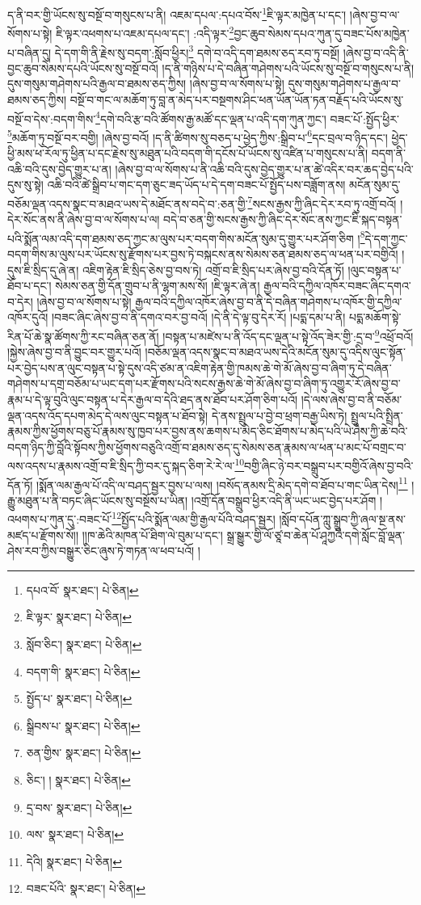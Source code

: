ད་ནི་བར་གྱི་ཡོངས་སུ་བསྔོ་བ་གསུངས་པ་ནི། འཇམ་དཔལ་:དཔའ་བོས་\footnote{དཔའ་བོ་  སྣར་ཐང་།  པེ་ཅིན། }ཇི་ལྟར་མཁྱེན་པ་དང་། །ཞེས་བྱ་བ་ལ་སོགས་པ་སྟེ། ཇི་ལྟར་འཕགས་པ་འཇམ་དཔལ་དང་། :འདི་ལྟར་\footnote{ཇི་ལྟར་  སྣར་ཐང་།  པེ་ཅིན། }བྱང་ཆུབ་སེམས་དཔའ་ཀུན་དུ་བཟང་པོས་མཁྱེན་པ་བཞིན་དུ། དེ་དག་གི་ནི་རྗེས་སུ་བདག་:སློབ་ཕྱིར།\footnote{སློབ་ཅིང་།  སྣར་ཐང་།  པེ་ཅིན། } དགེ་བ་འདི་དག་ཐམས་ཅད་རབ་ཏུ་བསྔོ། །ཞེས་བྱ་བ་འདི་ནི་བྱང་ཆུབ་སེམས་དཔའི་ཡོངས་སུ་བསྔོ་བའོ། །ད་ནི་གཉིས་པ་དེ་བཞིན་གཤེགས་པའི་ཡོངས་སུ་བསྔོ་བ་གསུངས་པ་ནི། དུས་གསུམ་གཤེགས་པའི་རྒྱལ་བ་ཐམས་ཅད་ཀྱིས། །ཞེས་བྱ་བ་ལ་སོགས་པ་སྟེ། དུས་གསུམ་གཤེགས་པ་རྒྱལ་བ་ཐམས་ཅད་ཀྱིས། བསྔོ་བ་གང་ལ་མཆོག་ཏུ་བླ་ན་མེད་པར་བསྔགས་ཤིང་ཕན་ཡོན་ཡོན་ཏན་བརྗོད་པའི་ཡོངས་སུ་བསྔོ་བ་དེས་:བདག་གིས་\footnote{བདག་གི་  སྣར་ཐང་།  པེ་ཅིན། }དགེ་བའི་རྩ་བའི་ཚོགས་རྒྱ་མཚོ་དང་ལྡན་པ་འདི་དག་ཀུན་ཀྱང་། བཟང་པོ་:སྤྱོད་ཕྱིར་\footnote{སྤྱོད་པ་  སྣར་ཐང་།  པེ་ཅིན། }མཆོག་ཏུ་བསྔོ་བར་བགྱི། །ཞེས་བྱ་བའོ། །ད་ནི་ཚིགས་སུ་བཅད་པ་ཕྱེད་ཀྱིས་:སྒྲིབ་པ་\footnote{སྒྲིབས་པ་  སྣར་ཐང་།  པེ་ཅིན། }དང་བྲལ་བ་ཉིད་དང་། ཕྱེད་ཕྱི་མས་ཕ་རོལ་ཏུ་ཕྱིན་པ་དང་རྗེས་སུ་མཐུན་པའི་བདག་གི་དངོས་པོ་ཡོངས་སུ་འཛིན་པ་གསུངས་པ་ནི། བདག་ནི་འཆི་བའི་དུས་བྱེད་གྱུར་པ་ན། །ཞེས་བྱ་བ་ལ་སོགས་པ་ནི་འཆི་བའི་དུས་བྱེད་གྱུར་པ་ན་ཚེ་འདིར་བར་ཆད་བྱེད་པའི་དུས་སུ་སྟེ། འཆི་བའི་ཚེ་སྒྲིབ་པ་གང་དག་ཅུང་ཟད་ཡོད་པ་དེ་དག་བཟང་པོ་སྤྱོད་པས་བཟློག་ནས། མངོན་སུམ་དུ་བཅོམ་ལྡན་འདས་སྣང་བ་མཐའ་ཡས་དེ་མཐོང་ནས་བདེ་བ་:ཅན་གྱི་\footnote{ཅན་གྱིས་  སྣར་ཐང་།  པེ་ཅིན། }སངས་རྒྱས་ཀྱི་ཞིང་དེར་རབ་ཏུ་འགྲོ་བའོ། །དེར་སོང་ནས་ནི་ཞེས་བྱ་བ་ལ་སོགས་པ་ལ། བདེ་བ་ཅན་གྱི་སངས་རྒྱས་ཀྱི་ཞིང་དེར་སོང་ནས་ཀྱང་ཇི་སྐད་བསྟན་པའི་སྨོན་ལམ་འདི་དག་ཐམས་ཅད་ཀྱང་མ་ལུས་པར་བདག་གིས་མངོན་སུམ་དུ་གྱུར་པར་ཤོག་ཅིག །\footnote{ཅིང་། །  སྣར་ཐང་།  པེ་ཅིན། }དེ་དག་ཀྱང་བདག་གིས་མ་ལུས་པར་ཡོངས་སུ་རྫོགས་པར་བྱས་ཏེ་བསྐངས་ནས་སེམས་ཅན་ཐམས་ཅད་ལ་ཕན་པར་བགྱིའོ། །དུས་ཇི་སྲིད་དུ་ཞེ་ན། འཇིག་རྟེན་ཇི་སྲིད་ཅེས་བྱ་བས་ཏེ། འགྲོ་བ་ཇི་སྲིད་པར་ཞེས་བྱ་བའི་དོན་ཏོ། །ལུང་བསྟན་པ་ཐོབ་པ་དང་། སེམས་ཅན་གྱི་དོན་གྲུབ་པ་ནི་ལྷག་མས་སོ། །ཇི་ལྟར་ཞེ་ན། རྒྱལ་བའི་དཀྱིལ་འཁོར་བཟང་ཞིང་དགའ་བ་དེར། །ཞེས་བྱ་བ་ལ་སོགས་པ་སྟེ། རྒྱལ་བའི་དཀྱིལ་འཁོར་ཞེས་བྱ་བ་ནི་དེ་བཞིན་གཤེགས་པ་འཁོར་གྱི་དཀྱིལ་འཁོར་དུའོ། །བཟང་ཞིང་ཞེས་བྱ་བ་ནི་དགའ་བར་བྱ་བའོ། །དེ་ནི་དེ་ལྟ་བུ་དེར་རོ། །པདྨ་དམ་པ་ནི། པདྨ་མཆོག་སྟེ་རིན་པོ་ཆེ་སྣ་ཚོགས་ཀྱི་རང་བཞིན་ཅན་ནོ། །བསྟན་པ་མཛེས་པ་ནི་འོད་དང་ལྡན་པ་སྟེ་འོད་ཟེར་གྱི་:དྲ་བ་\footnote{དྲ་བས་  སྣར་ཐང་།  པེ་ཅིན། }འཕྲོ་བའོ། །སྐྱེས་ཞེས་བྱ་བ་ནི་བྱུང་བར་གྱུར་པའོ། །བཅོམ་ལྡན་འདས་སྣང་བ་མཐའ་ཡས་དེའི་མངོན་སུམ་དུ་འདིས་ལུང་སྟོན་པར་བྱེད་པས་ན་ལུང་བསྟན་པ་སྟེ་དུས་འདི་ཙམ་ན་འཇིག་རྟེན་གྱི་ཁམས་ཆེ་གེ་མོ་ཞེས་བྱ་བ་ཞིག་ཏུ་དེ་བཞིན་གཤེགས་པ་དགྲ་བཅོམ་པ་ཡང་དག་པར་རྫོགས་པའི་སངས་རྒྱས་ཆེ་གེ་མོ་ཞེས་བྱ་བ་ཞིག་ཏུ་འགྱུར་རོ་ཞེས་བྱ་བ་རྣམ་པ་དེ་ལྟ་བུའི་ལུང་བསྟན་པ་དེར་རྒྱལ་བ་དེའི་ཐད་ནས་ཐོབ་པར་ཤོག་ཅིག་པའོ། །དེ་ལས་ཞེས་བྱ་བ་ནི་བཅོམ་ལྡན་འདས་འོད་དཔག་མེད་དེ་ལས་ལུང་བསྟན་པ་ཐོབ་སྟེ། དེ་ནས་སྤྲུལ་པ་བྱེ་བ་ཕྲག་བརྒྱ་ཡིས་ཏེ། སྤྲུལ་པའི་སྤྲིན་རྣམས་ཀྱིས་ཕྱོགས་བཅུ་པོ་རྣམས་སུ་ཁྱབ་པར་བྱས་ནས་ཆགས་པ་མེད་ཅིང་ཐོགས་པ་མེད་པའི་ཡེ་ཤེས་ཀྱི་ཆེ་བའི་བདག་ཉིད་ཀྱི་བློའི་སྟོབས་ཀྱིས་ཕྱོགས་བཅུའི་འགྲོ་བ་ཐམས་ཅད་དུ་སེམས་ཅན་རྣམས་ལ་ཕན་པ་མང་པོ་བགྲང་བ་ལས་འདས་པ་རྣམས་འགྲོ་བ་ཇི་སྲིད་ཀྱི་བར་དུ་སྐད་ཅིག་རེ་རེ་ལ་\footnote{ལས་  སྣར་ཐང་།  པེ་ཅིན། }བགྱི་ཞིང་ཉེ་བར་བསྒྲུབ་པར་བགྱིའོ་ཞེས་བྱ་བའི་དོན་ཏོ། །སྨོན་ལམ་རྒྱལ་པོ་འདི་ལ་བཤད་སྦྱར་བྱས་པ་ལས། །བསོད་ནམས་དྲི་མེད་དགེ་བ་ཐོབ་པ་གང་ཡིན་དེས།\footnote{དེའི།  སྣར་ཐང་།  པེ་ཅིན། } །རྒྱུ་མཐུན་པ་ནི་བཏང་ཞིང་ཡོངས་སུ་བསྔོས་པ་ཡིན། །འགྲོ་དོན་བསྒྲུབ་ཕྱིར་འདི་ནི་ཡང་ཡང་བྱེད་པར་ཤོག །འཕགས་པ་ཀུན་དུ་:བཟང་པོ་\footnote{བཟང་པོའི་  སྣར་ཐང་།  པེ་ཅིན། }སྤྱོད་པའི་སྨོན་ལམ་གྱི་རྒྱལ་པོའི་བཤད་སྦྱར། །སློབ་དཔོན་ཀླུ་སྒྲུབ་ཀྱི་ཞལ་སྔ་ནས་མཛད་པ་རྫོགས་སོ།། །།ཁ་ཆེའི་མཁན་པོ་ཐིག་ལེ་བུམ་པ་དང་། སྒྲ་སྒྱུར་གྱི་ལོ་ཙཱ་བ་ཆེན་པོ་ཤཱཀྱའི་དགེ་སློང་བློ་ལྡན་ཤེས་རབ་ཀྱིས་བསྒྱུར་ཅིང་ཞུས་ཏེ་གཏན་ལ་ཕབ་པའོ། ། 